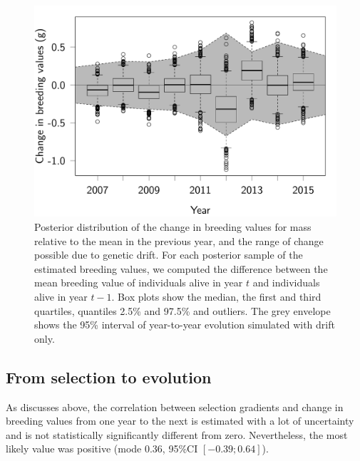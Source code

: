\begin{figure}[ht]
\includegraphics[width=\textwidth]{FiguresFluSel/EvolDiff-1}
\caption{Posterior distribution of the change in breeding values for mass relative to the mean in the previous year, and the range of change possible due to genetic drift. For each posterior sample of the estimated breeding values, we computed the difference between the mean breeding value of individuals alive in year $t$ and individuals alive in year $t-1$. Box plots show the median, the first and third quartiles, quantiles 2.5\% and 97.5\% and outliers. The grey envelope shows the 95\% interval of year-to-year evolution simulated with drift only.}
\label{fig:evoldiff}
\end{figure}

\subsection*{From selection to evolution}

As discusses above, the correlation between selection gradients and change in breeding values from one year to the next is estimated with a lot of uncertainty and is not statistically significantly different from zero. Nevertheless, the most likely value was positive (mode 0.36, 95\%CI $[-0.39; 0.64]$).

